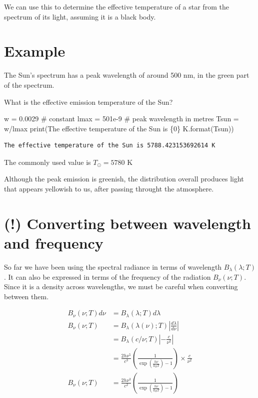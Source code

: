 \documentclass[
  letterpaper,
  DIV=11,
  numbers=noendperiod]{scrreprt}
\newenvironment{Shaded}{\begin{snugshade}}{\end{snugshade}}
\newcommand{\BuiltInTok}[1]{\textcolor[rgb]{0.00,0.23,0.31}{#1}}
\newcommand{\CommentTok}[1]{\textcolor[rgb]{0.37,0.37,0.37}{#1}}
\newcommand{\FloatTok}[1]{\textcolor[rgb]{0.68,0.00,0.00}{#1}}
\newcommand{\NormalTok}[1]{\textcolor[rgb]{0.00,0.23,0.31}{#1}}
\newcommand{\OperatorTok}[1]{\textcolor[rgb]{0.37,0.37,0.37}{#1}}
\newcommand{\SpecialCharTok}[1]{\textcolor[rgb]{0.37,0.37,0.37}{#1}}
\newcommand{\StringTok}[1]{\textcolor[rgb]{0.13,0.47,0.30}{#1}}
\begin{document}
We can use this to determine the effective temperature of a star from
the spectrum of its light, assuming it is a black body.

\hypertarget{example-2}{%
\section{Example}\label{example-2}}

The Sun's spectrum has a peak wavelength of around 500 nm, in the green
part of the spectrum.

What is the effective emission temperature of the Sun?

\begin{Shaded}
\begin{Highlighting}[]
\NormalTok{w }\OperatorTok{=} \FloatTok{0.0029} \CommentTok{\# constant}
\NormalTok{lmax }\OperatorTok{=} \FloatTok{501e{-}9} \CommentTok{\# peak wavelength in metres}
\NormalTok{Tsun }\OperatorTok{=}\NormalTok{ w}\OperatorTok{/}\NormalTok{lmax}
\BuiltInTok{print}\NormalTok{(}\StringTok{\textquotesingle{}The effective temperature of the Sun is }\SpecialCharTok{\{0\}}\StringTok{ K\textquotesingle{}}\NormalTok{.}\BuiltInTok{format}\NormalTok{(Tsun))}
\end{Highlighting}
\end{Shaded}

\begin{verbatim}
The effective temperature of the Sun is 5788.423153692614 K
\end{verbatim}

The commonly used value is \(T_\odot=5780\) K

Although the peak emission is greenish, the distribution overall
produces light that appears yellowish to us, after passing throught the
atmosphere.

\hypertarget{converting-between-wavelength-and-frequency}{%
\section{(!) Converting between wavelength and
frequency}\label{converting-between-wavelength-and-frequency}}

So far we have been using the spectral radiance in terms of wavelength
\(B_\lambda(\lambda;T)\). It can also be expressed in terms of the
frequency of the radiation \(B_\nu(\nu;T)\). Since it is a density
across wavelengths, we must be careful when converting between them.

\begin{align}
B_\nu(\nu;T)d\nu &= B_\lambda(\lambda;T)d\lambda \\
B_\nu(\nu;T) &= B_\lambda(\lambda(\nu);T) \left|\frac{d\lambda}{d\nu}\right| \\
 &= B_\lambda(c/\nu; T) \left|-\frac{c}{\nu^2}\right| \\
  &= \frac{2h\nu^5}{c^3}\left( \frac{1}{\exp\left(\frac{h\nu}{k_BT}\right)-1} \right) \times \frac{c}{\nu^2} \\
  B_\nu(\nu;T) &= \frac{2h\nu^3}{c^2}\left( \frac{1}{\exp\left(\frac{h\nu}{k_BT}\right)-1}\right)
\end{align}
\end{document}
